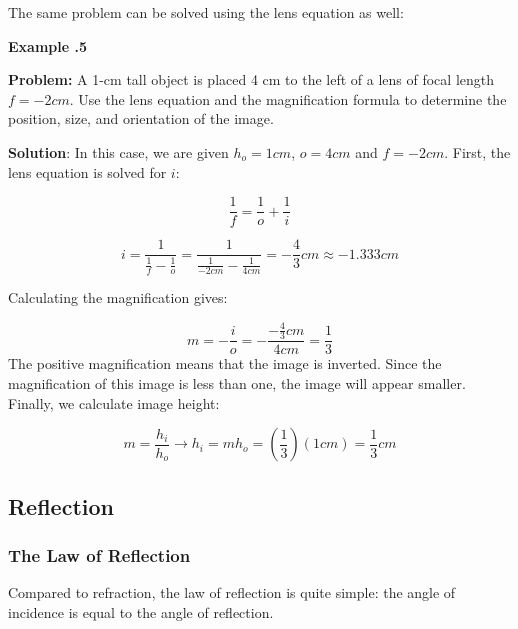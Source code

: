 The same problem can be solved using the lens equation as well:

 \begin{mdframed}[backgroundcolor=blue!10!white]
	\begin{center}	
		\textbf{Example \thesection.5}	
	\end{center}
	
	\textbf{Problem:} A 1-cm tall object is placed 4 cm to the left of a lens of focal length $f=-2 \si{cm}$.  Use the lens equation and the magnification formula to determine the position, size, and orientation of the image.  
	
	\textbf{Solution}: In this case, we are given $h_o = 1 \si{cm}$, $o = 4 \si{cm}$ and $f = -2 \si{cm}$.  First, the lens equation is solved for $i$:
	
	\begin{equation*}
	\frac{1}{f} = \frac{1}{o} + \frac{1}{i}  
	\end{equation*}
	
	
	\begin{equation*}
	i = \frac{1}{\frac{1}{f}-\frac{1}{o}} = \frac{1}{\frac{1}{-2\si{cm}}-\frac{1}{4\si{cm}}} = \boxed{-\frac{4}{3} \si{cm} \approx -1.333 \si{cm}}
	\end{equation*}
	
	
	Calculating the magnification gives: 
	
	\begin{equation*}
	m = - \frac{i}{o} = -\frac{-\frac{4}{3}\si{cm}}{4\si{cm}} = \boxed{\frac{1}{3}}
	\end{equation*}
	The positive magnification means that the image is inverted.  Since the magnification of this image is less than one, the image will appear smaller.  Finally, we calculate image height:  
	
	\begin{equation*}
	m = \frac{h_i}{h_o} \longrightarrow h_i = m h_o = (\frac{1}{3}) (1 \si{cm}) = \boxed{\frac{1}{3} \si{cm}}
	\end{equation*}
\end{mdframed}





		

	\subsection{Reflection} 
	
			\subsubsection{The Law of Reflection}   
			Compared to refraction, the law of reflection is quite simple: the angle of incidence is equal to the angle of reflection.  
			
